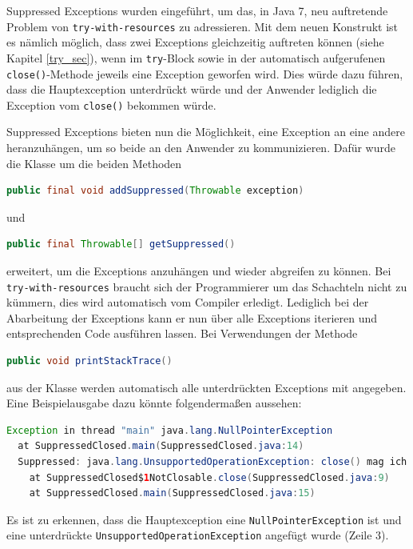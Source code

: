 \documentclass[times, 10pt,twocolumn]{article}
\begin{document}
\label{supp_exception_subsec}
Suppressed Exceptions wurden eingeführt, um das, in Java 7, neu auftretende Problem von \texttt{try-with-resources} zu adressieren.
Mit dem neuen Konstrukt ist es nämlich möglich, dass zwei Exceptions gleichzeitig auftreten können (siehe Kapitel \ref{try_sec}), wenn im
\texttt{try}-Block sowie in der automatisch aufgerufenen \texttt{close()}-Methode jeweils eine Exception geworfen wird. Dies würde
dazu führen, dass die Hauptexception unterdrückt würde und der Anwender lediglich die Exception vom \texttt{close()} bekommen würde.

Suppressed Exceptions bieten nun die Möglichkeit, eine Exception an eine andere heranzuhängen, um so beide an den Anwender zu
kommunizieren. Dafür wurde die Klasse  um die beiden Methoden 
\begin{lstlisting}[language=java,breaklines=true]
public final void addSuppressed(Throwable exception)
\end{lstlisting}
und 
\begin{lstlisting}[language=java,breaklines=true]
public final Throwable[] getSuppressed()
\end{lstlisting}
erweitert, um die Exceptions anzuhängen und wieder abgreifen zu können. 
Bei \texttt{try-with-resources} braucht sich der Programmierer um das Schachteln nicht zu kümmern, dies wird 
automatisch vom Compiler erledigt.\cite{sbJ7coin} Lediglich bei der Abarbeitung der Exceptions kann er nun über
alle Exceptions iterieren und entsprechenden Code ausführen lassen. Bei Verwendungen der Methode
\begin{lstlisting}[language=java,breaklines=true]
public void printStackTrace()
\end{lstlisting}
aus der Klasse  werden automatisch alle unterdrückten Exceptions mit angegeben. Eine Beispielausgabe dazu könnte
folgendermaßen aussehen\cite{javainsel2}:
\begin{lstlisting}[language=java,breaklines=true]
Exception in thread "main" java.lang.NullPointerException
  at SuppressedClosed.main(SuppressedClosed.java:14)
  Suppressed: java.lang.UnsupportedOperationException: close() mag ich nicht
    at SuppressedClosed$1NotClosable.close(SuppressedClosed.java:9)
    at SuppressedClosed.main(SuppressedClosed.java:15)
\end{lstlisting}

Es ist zu erkennen, dass die Hauptexception eine \texttt{NullPointerException} ist und eine unterdrückte 
\texttt{UnsupportedOperationException} angefügt wurde (Zeile 3).
\end{document}

